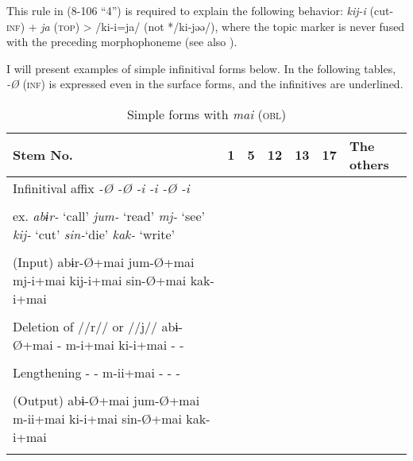 This rule in (8-106 “4”) is required to explain the following behavior: \textit{kij-i} (cut-\textsc{inf}) + \textit{ja} (\textsc{top}) > /ki-i=ja/ (not */ki-jəə/), where the topic marker is never fused with the preceding morphophoneme (see also ).

I will present examples of simple infinitival forms below. In the following tables, \textit{-Ø} (\textsc{inf}) is expressed even in the surface forms, and the infinitives are underlined.

\begin{table}
\caption{\label{tab:key:81}Simple forms with  \textit{mai}  (\textsc{obl})}
\begin{tabular}{l llllll}
\lsptoprule
Stem No. &  1 & 5 & 12  &13 & 17 & The others\\
\midrule
Infinitival affix  \textit{-Ø  -Ø  -i  -i  -Ø  -i}                                                                                              \\
                                                                                                                                                \\
ex.  \textit{abɨr-} ‘call’  \textit{jum-} ‘read’  \textit{mj-} ‘see’  \textit{kij-} ‘cut’  \textit{sin-}‘die’  \textit{kak-} ‘write’            \\
                                                                                                                                                \\
(Input)  abɨr-Ø+mai  jum-Ø+mai  mj-i+mai  kij-i+mai  sin-Ø+mai  kak-i+mai                                                                       \\
                                                                                                                                                \\
Deletion of //r// or //j//  abɨ-Ø+mai  -  m-i+mai  ki-i+mai  -  -                                                                               \\
                                                                                                                                                \\
Lengthening  -  -  m-ii+mai  -  -  -                                                                                                            \\
                                                                                                                                                \\
(Output)  abɨ-Ø+mai  jum-Ø+mai  m-ii+mai  ki-i+mai  sin-Ø+mai  kak-i+mai                                                                        \\
\lspbottomrule
\end{tabular}
\end{table}

